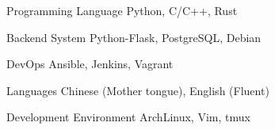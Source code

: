 

\begin{cvskills}

  \cvskill
    {Programming Language} %
    {Python, C/C++, Rust} %

  \cvskill
    {Backend System} %
    {Python-Flask, PostgreSQL, Debian} %

  \cvskill
    {DevOps} %
    {Ansible, Jenkins, Vagrant} %

  \cvskill
    {Languages} %
    {Chinese (Mother tongue), English (Fluent)} %

  \cvskill
    {Development Environment} %
    {ArchLinux, Vim, tmux} %

\end{cvskills}
